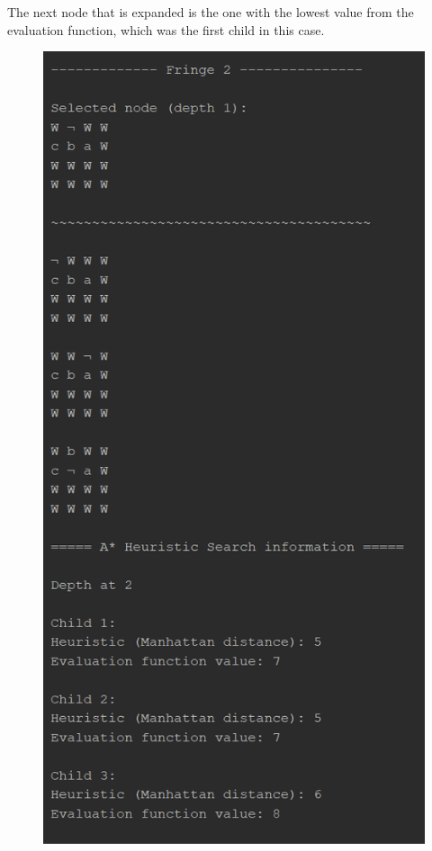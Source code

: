 \documentclass{article}
\begin{document}
	\newpage
	The next node that is expanded is the one with the lowest value from the evaluation function, which was the first child in this case.
	\begin{figure}[h]
		\centering
		\includegraphics[height=0.75\textheight]{AStar-2-2.png}
	\end{figure}
\end{document}

